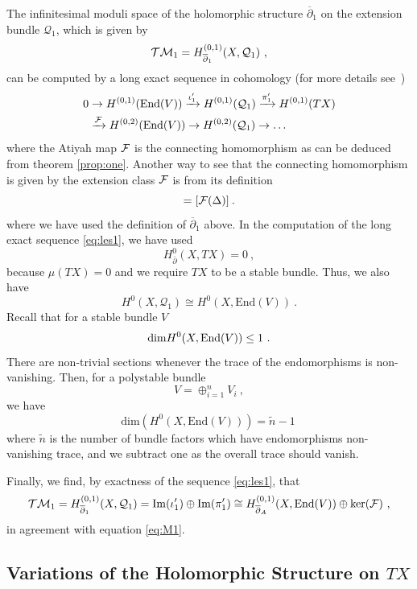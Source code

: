 \documentclass[12pt,a4paper]{article}
\def\bar#1{\overline{#1}}
\def\End{\textrm{End}}
\def\ker{\textrm{ker}}
\def\bp{\bar{\partial}}
\def\Q{\mathcal{Q}}
\theoremstyle{definition}
\begin{document}
The infinitesimal moduli space of the holomorphic structure $\bp_1$ on the extension bundle $\Q_1$, which is given by
\[{\cal TM}_1 = H^{(0,1)}_{\bp_1}(X, {\cal Q}_1)~,\]
can be computed by a long exact sequence in cohomology (for more details see~\cite{Anderson:2010mh})
\begin{equation} 
\begin{split}
0 &\rightarrow H^{(0,1)}(\End(V)) \xrightarrow{\iota_1'} H^{(0,1)}(\Q_1) \xrightarrow{\pi_1'} H^{(0,1)}(TX) \\
&\xrightarrow{\cal F} H^{(0,2)}(\End(V)) \rightarrow H^{(0,2)}(\Q_1) \rightarrow \ldots
\label{eq:les1}
\end{split}
\end{equation}
where the Atiyah map $\cal F$ is the connecting homomorphism as can be deduced from theorem \ref{prop:one}. Another way to see that the connecting homomorphism is given by the extension class $\cal F$ is from its definition
\begin{equation}
[\iota_1^{-1}\circ\bp_1\circ \pi_1^{-1}(x)]=[{\cal F}(\Delta)]\:.
\end{equation}
where we have used the definition of $\bp_1$ above.  In the computation of the long exact sequence \eqref{eq:les1},  we have used
\[H_{\bp}^0(X,TX) = 0~,\]
because $\mu(TX)= 0$ and we require $TX$ to be a stable bundle. Thus, we also have
\begin{equation}
 H^0(X, \Q_1) \cong H^0(X, \End(V))~.\label{eq:nosecQ1}
 \end{equation} 
Recall that for a stable bundle $V$   
\[ {\rm dim} H^0(X, \End(V))\le 1~.\] 
There are non-trivial sections whenever the trace of the endomorphisms is non-vanishing. Then,  for a polystable bundle
\begin{equation*}
V=\oplus_{i=1}^nV_i~,
\end{equation*}
we have 
\[\textrm{dim}(H^0(X, \End(V)))=\tilde n-1~\]
where $\tilde n$ is the number of bundle factors which have  endomorphisms non-vanishing trace, and we subtract one as the overall trace should vanish.

Finally, we find, by exactness of the sequence \eqref{eq:les1}, that
\[{\cal TM}_1= H_{\bp_1}^{(0,1)}(X, \Q_1) = {\rm Im}(\iota_1') \oplus {\rm Im}(\pi_1') \cong
H_{\bp_A}^{(0,1)}(X,\End(V))\oplus \ker({\cal F}) ~,\]
in agreement with equation \eqref{eq:M1}.

\subsection{Variations of the Holomorphic Structure on \texorpdfstring{$TX$}.}
\label{subsec:defsTX}
\end{document}
